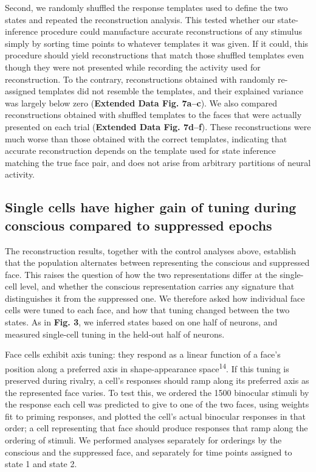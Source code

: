 \documentclass{article}
\begin{document}
Second, we randomly shuffled the response templates used to define the two states and repeated the reconstruction analysis. This tested whether our state-inference procedure could manufacture accurate reconstructions of any stimulus simply by sorting time points to whatever templates it was given. If it could, this procedure should yield reconstructions that match those shuffled templates even though they were not presented while recording the activity used for reconstruction. To the contrary, reconstructions obtained with randomly re-assigned templates did not resemble the templates, and their explained variance was largely below zero (\textbf{Extended Data Fig. 7a--c}). We also compared reconstructions obtained with shuffled templates to the faces that were actually presented on each trial (\textbf{Extended Data Fig. 7d--f}). These reconstructions were much worse than those obtained with the correct templates, indicating that accurate reconstruction depends on the template used for state inference matching the true face pair, and does not arise from arbitrary partitions of neural activity.

\subsection*{Single cells have higher gain of tuning during conscious compared to suppressed epochs}

The reconstruction results, together with the control analyses above, establish that the population alternates between representing the conscious and suppressed face. This raises the question of how the two representations differ at the single-cell level, and whether the conscious representation carries any signature that distinguishes it from the suppressed one. We therefore asked how individual face cells were tuned to each face, and how that tuning changed between the two states. As in \textbf{Fig. 3}, we inferred states based on one half of neurons, and measured single-cell tuning in the held-out half of neurons.

Face cells exhibit axis tuning: they respond as a linear function of a face's position along a preferred axis in shape-appearance space\textsuperscript{14}. If this tuning is preserved during rivalry, a cell's responses should ramp along its preferred axis as the represented face varies. To test this, we ordered the 1500 binocular stimuli by the response each cell was predicted to give to one of the two faces, using weights fit to priming responses, and plotted the cell's actual binocular responses in that order; a cell representing that face should produce responses that ramp along the ordering of stimuli. We performed analyses separately for orderings by the conscious and the suppressed face, and separately for time points assigned to state 1 and state 2.
\end{document}

